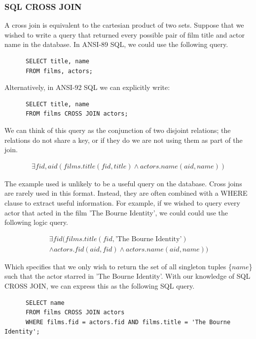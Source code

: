 \documentclass[a4paper, 11pt]{article}
\begin{document}
    \subsubsection{SQL CROSS JOIN}

      A cross join is equivalent to the cartesian product of two sets. Suppose
      that we wished to write a query that returned every possible pair of
      film title and actor name in the database. In ANSI-89 SQL, we could use 
      the following query.

      \begin{verbatim}
      SELECT title, name
      FROM films, actors;
      \end{verbatim}

      Alternatively, in ANSI-92 SQL we can explicitly write:

      \begin{verbatim}
      SELECT title, name
      FROM films CROSS JOIN actors;
      \end{verbatim}

      We can think of this query as the conjunction of two disjoint relations;
      the relations do not share a key, or if they do we are not using them as
      part of the join.

      \begin{gather}
        \exists fid, aid(films.title(fid, title) \land actors.name(aid, name))
      \end{gather}

      The example used is unlikely to be a useful query on the database. Cross
      joins are rarely used in this format. Instead, they are often combined
      with a WHERE clause to extract useful information. For example, if we
      wished to query every actor that acted in the film 'The Bourne Identity',
      we could could use the following logic query.

      \begin{gather}
        \exists fid(films.title(fid, \text{'The Bourne Identity'}) \nonumber\\
        \land actors.fid(aid, fid) \land actors.name(aid, name))
      \end{gather}

      Which specifies that we only wish to return the set of all singleton
      tuples \{$name$\} such that the actor starred in 'The Bourne Identity'.
      With our knowledge of SQL CROSS JOIN, we can express this as the
      following SQL query.

      \begin{verbatim}
      SELECT name
      FROM films CROSS JOIN actors
      WHERE films.fid = actors.fid AND films.title = 'The Bourne Identity';
      \end{verbatim}
\end{document}
